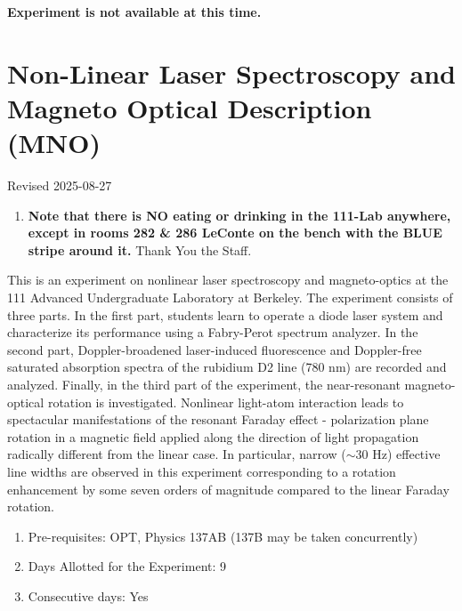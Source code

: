\documentclass{../lab}
\begin{document}
\maketitle

\vspace{3cm}
\centerline{\Huge \bf Experiment is not available at this time.}

\newpage


\tableofcontents

\section{Non-Linear Laser Spectroscopy and Magneto Optical Description (MNO)}

Revised 2025-08-27

\begin{enumerate}
    \item \textbf{Note that there is NO eating or drinking in the 111-Lab anywhere, except in rooms 282 \& 286 LeConte on the bench with the BLUE stripe around it.} Thank You the Staff.

\end{enumerate}

\newpage

This is an experiment on nonlinear laser spectroscopy and magneto-optics at the 111 Advanced Undergraduate Laboratory at Berkeley. The experiment consists of three parts. In the first part, students learn to operate a diode laser system and characterize its performance using a Fabry-Perot spectrum analyzer. In the second part, Doppler-broadened laser-induced fluorescence and Doppler-free saturated absorption spectra of the rubidium D2 line (780 nm) are recorded and analyzed. Finally, in the third part of the experiment, the near-resonant magneto-optical rotation is investigated. Nonlinear light-atom interaction leads to spectacular manifestations of the resonant Faraday effect - polarization plane rotation in a magnetic field applied along the direction of light propagation radically different from the linear case. In particular, narrow ($\sim$30 Hz) effective line widths are observed in this experiment corresponding to a rotation enhancement by some seven orders of magnitude compared to the linear Faraday rotation.

\begin{enumerate}
    \item Pre-requisites: OPT, Physics 137AB (137B may be taken concurrently)

    \item Days Allotted for the Experiment: 9

    \item Consecutive days: Yes

\end{enumerate}
\end{document}
